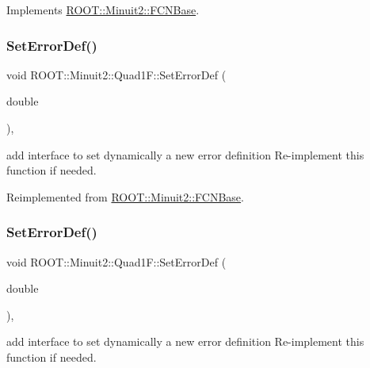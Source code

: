 Implements \mbox{\hyperlink{classROOT_1_1Minuit2_1_1FCNBase_ae4a86bd94d0d0f5ca6fc8f8ab2bb43cd}{R\+O\+O\+T\+::\+Minuit2\+::\+F\+C\+N\+Base}}.

\mbox{\label{classROOT_1_1Minuit2_1_1Quad1F_a086ed11e56374ff0331676d7eac34395}} 
\subsubsection{\texorpdfstring{SetErrorDef()}{SetErrorDef()}\hspace{0.1cm}{\footnotesize\ttfamily [1/2]}}
{\footnotesize\ttfamily void R\+O\+O\+T\+::\+Minuit2\+::\+Quad1\+F\+::\+Set\+Error\+Def (\begin{DoxyParamCaption}\item[{double}]{ }\end{DoxyParamCaption})\hspace{0.3cm}{\ttfamily [inline]}, {\ttfamily [virtual]}}

add interface to set dynamically a new error definition Re-\/implement this function if needed. 

Reimplemented from \mbox{\hyperlink{classROOT_1_1Minuit2_1_1FCNBase_a840e02c2e6ef96eec289deca096b6088}{R\+O\+O\+T\+::\+Minuit2\+::\+F\+C\+N\+Base}}.

\mbox{\label{classROOT_1_1Minuit2_1_1Quad1F_a086ed11e56374ff0331676d7eac34395}} 
\subsubsection{\texorpdfstring{SetErrorDef()}{SetErrorDef()}\hspace{0.1cm}{\footnotesize\ttfamily [2/2]}}
{\footnotesize\ttfamily void R\+O\+O\+T\+::\+Minuit2\+::\+Quad1\+F\+::\+Set\+Error\+Def (\begin{DoxyParamCaption}\item[{double}]{ }\end{DoxyParamCaption})\hspace{0.3cm}{\ttfamily [inline]}, {\ttfamily [virtual]}}

add interface to set dynamically a new error definition Re-\/implement this function if needed. 

